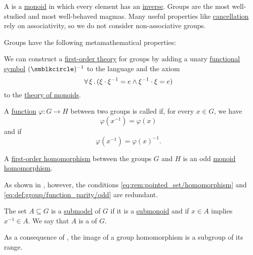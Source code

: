 \begin{definition}\label{def:group}
  A  is a \hyperref[def:monoid]{monoid} in which every element has an \hyperref[def:monoid_inverse]{inverse}. Groups are the most well-studied and most well-behaved magmas. Many useful properties like \hyperref[thm:def:group/cancellative]{cancellation} rely on associativity, so we do not consider non-associative groups.

  Groups have the following metamathematical properties:
  \begin{thmenum}
     We can construct a \hyperref[def:first_order_theory]{first-order theory} for groups by adding a unary \hyperref[def:first_order_language/func]{functional symbol} \( (\anon)^{-1} \) to the language and the axiom
    \begin{equation}\label{eq:def:group/theory/inverse_axiom}
      \forall \thinspace \xi \thinspace . \thinspace (\xi \cdot \xi^{-1} = e \wedge \xi^{-1} \cdot \xi = e)
    \end{equation}
    to the \hyperref[def:monoid/theory]{theory of monoids}.

     A \hyperref[def:function]{function} \( \varphi: G \to H \) between two groups is called  if, for every \( x \in G \), we have
    \begin{equation}\label{eq:def:group/function_parity/even}
      \varphi(x^{-1}) = \varphi(x)
    \end{equation}
    and  if
    \begin{equation}\label{eq:def:group/function_parity/odd}
      \varphi(x^{-1}) = \varphi(x)^{-1}.
    \end{equation}

     A \hyperref[def:first_order_homomorphism]{first-order homomorphism} between the groups \( G \) and \( H \) is an odd \hyperref[def:monoid/homomorphism]{monoid homomorphism}.

    As shown in , however, the conditions \eqref{eq:rem:pointed_set/homomorphism} and \eqref{eq:def:group/function_parity/odd} are redundant.

     The set \( A \subseteq G \) is a \hyperref[thm:substructure_is_model]{submodel} of \( G \) if it is a \hyperref[def:monoid/submodel]{submonoid} and if \( x \in A \) implies \( x^{-1} \in A \). We say that \( A \) is a  of \( G \).

    As a consequence of , the image of a group homomorphism is a subgroup of its range.


\end{thmenum}
\end{definition}
